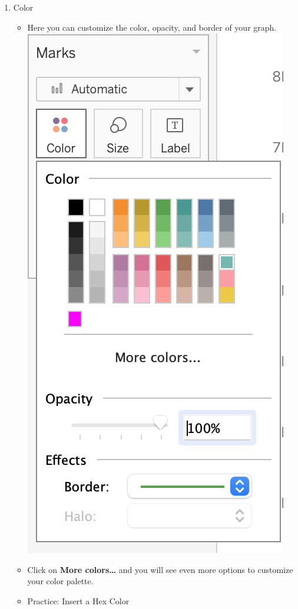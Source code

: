 \documentclass[
]{book}
\begin{document}
\begin{enumerate}
\def\labelenumi{\arabic{enumi}.}
\setcounter{enumi}{1}
\item
  Color

  \begin{itemize}
  \item
    Here you can customize the color, opacity, and border of your graph.
    \includegraphics{images/M3S2_color-marks-menu.png}
  \item
    Click on \textbf{More colors\ldots{}} and you will see even more options to customize your color palette.
  \item
    Practice: Insert a Hex Color


\end{itemize}
\end{enumerate}
\end{document}
